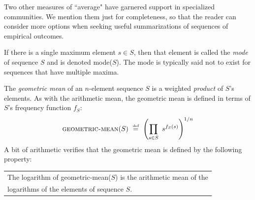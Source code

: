 \bigskip

\noindent {}
\bigskip

Two other measures of ``average" have garnered support in specialized communities.  We mention them just for completeness, so that the reader can consider more options when seeking useful summarizations of sequences of empirical outcomes.

\medskip

 

\noindent
If there is a single maximum element $s \in S$, then that element is called the {\em mode} of sequence $S$ and is denoted {\sc mode}($S$).  The mode is typically said not to exist for sequences that have multiple maxima.

\medskip

   

\noindent
The {\it geometric mean} of an $n$-element sequence $S$ is a weighted {\em product} of $S$'s elements.  As with the arithmetic mean, the geometric mean is defined in terms of $S$'s frequency function $f_S$:
\[ \mbox{\sc geometric-mean}(S) \ \stackrel{\mbox{{\tiny def}}}{=} \  \left(\prod_{s \in S} \ s^{f_S(s)} \right)^{1/n} \]
A bit of arithmetic verifies that the geometric mean is defined by the following property:

\smallskip

{\em 
\begin{tabular}{l}
The logarithm of {\sc geometric-mean}($S$) is the arithmetic mean of the \\
logarithms of the elements of sequence $S$.
\end{tabular}
}

